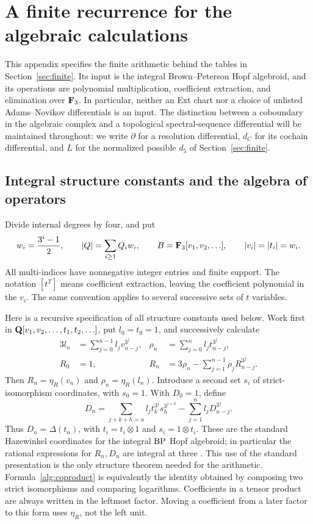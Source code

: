 \section{A finite recurrence for the algebraic calculations}
\label{app:recurrence}

This appendix specifies the finite arithmetic behind the tables in
Section~\ref{sec:finite}.  Its input is the integral Brown--Peterson Hopf
algebroid, and its operations are polynomial multiplication, coefficient
extraction, and elimination over $\mathbf F_3$.  In particular, neither an Ext
chart nor a choice of unlisted Adams--Novikov differentials is an input.
The distinction between a coboundary in the algebraic complex and a
topological spectral-sequence differential will be maintained throughout:
we write $\partial$ for a resolution differential, $d_C$ for its cochain
differential, and $L$ for the normalized possible $d_5$ of
Section~\ref{sec:finite}.

\subsection{Integral structure constants and the algebra of operators}

Divide internal degrees by four, and put
\[
 w_i=\frac{3^i-1}{2},\qquad
 |Q|=\sum_{i\geq1}Q_iw_i,\qquad
 B=\mathbf F_3[v_1,v_2,\ldots],\qquad |v_i|=|t_i|=w_i.
\]
All multi-indices have nonnegative integer entries and finite support.
The notation $[t^T]$ means coefficient extraction, leaving the coefficient
polynomial in the $v_i$.  The same convention applies to several successive
sets of $t$ variables.

Here is a recursive specification of all structure constants used below.
Work first in $\mathbf Q[v_1,v_2,\ldots,t_1,t_2,\ldots]$, put $l_0=t_0=1$, and
successively calculate
\begin{align}
 3l_n&=\sum_{j=0}^{n-1}l_jv_{n-j}^{3^j},
 &\rho_n&=\sum_{j=0}^{n}l_jt_{n-j}^{3^j},\label{alg:logarithms}\\
 R_0&=1,
 &R_n&=3\rho_n-\sum_{j=1}^{n-1}\rho_jR_{n-j}^{3^j}.
 \label{alg:right-unit}
\end{align}
Then $R_n=\eta_R(v_n)$ and $\rho_n=\eta_R(l_n)$.  Introduce a second set
$s_i$ of strict-isomorphism coordinates, with $s_0=1$.  With $D_0=1$, define
\begin{equation}\label{alg:coproduct}
 D_n=\sum_{j+k+h=n}l_jt_k^{3^j}s_h^{3^{j+k}}
          -\sum_{j=1}^{n}l_jD_{n-j}^{3^j}.
\end{equation}
Thus $D_n=\Delta(t_n)$, with $t_i=t_i\otimes1$ and
$s_i=1\otimes t_i$.  These are the standard Hazewinkel coordinates for
the integral $\mathrm{BP}$ Hopf algebroid; in particular the rational expressions
for $R_n,D_n$ are integral at three
\cite[Theorem~A2.1.27, Equation~(A2.2.1), and Theorem~A2.2.3]{Ravenel}.  This use of the
standard presentation is the only structure theorem needed for the
arithmetic.  Formula~\eqref{alg:coproduct} is equivalently the identity
obtained by composing two strict isomorphisms and comparing logarithms.
Coefficients in a tensor product are always written in the leftmost
factor.  Moving a coefficient from a later factor to this form uses
$\eta_R$, not the left unit.

